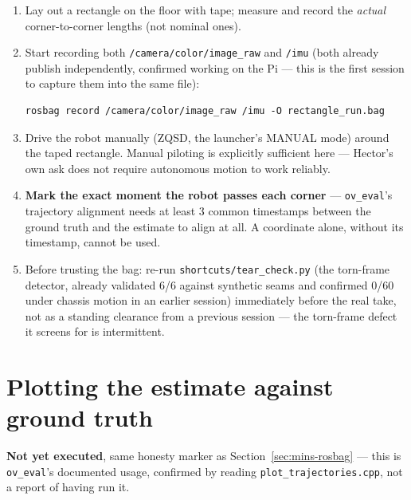 \documentclass[11pt]{report}
\newenvironment{warningbox}%
  {\begin{lrbox}{\warnbox}\begin{minipage}{0.90\textwidth}}%
  {\end{minipage}\end{lrbox}%
   \begin{center}\fcolorbox{black}{codebg}{\usebox{\warnbox}}\end{center}}
\begin{document}
\begin{enumerate}
  \item Lay out a rectangle on the floor with tape; measure and record the
  \emph{actual} corner-to-corner lengths (not nominal ones).
  \item Start recording both \texttt{/camera/color/image\_raw} and
  \texttt{/imu} (both already publish independently, confirmed working on
  the Pi --- this is the first session to capture them into the same file):
\begin{lstlisting}[style=shell]
rosbag record /camera/color/image_raw /imu -O rectangle_run.bag
\end{lstlisting}
  \item Drive the robot manually (ZQSD, the launcher's MANUAL mode) around
  the taped rectangle. Manual piloting is explicitly sufficient here ---
  Hector's own ask does not require autonomous motion to work reliably.
  \item \textbf{Mark the exact moment the robot passes each corner} ---
  \texttt{ov\_eval}'s trajectory alignment needs at least 3 common
  timestamps between the ground truth and the estimate to align at all.
  A coordinate alone, without its timestamp, cannot be used.
  \item Before trusting the bag: re-run \texttt{shortcuts/tear\_check.py}
  (the torn-frame detector, already validated 6/6 against synthetic seams
  and confirmed 0/60 under chassis motion in an earlier session) immediately
  before the real take, not as a standing clearance from a previous session
  --- the torn-frame defect it screens for is intermittent.
\end{enumerate}

\section{Plotting the estimate against ground truth}

\begin{warningbox}
\textbf{Not yet executed}, same honesty marker as
Section~\ref{sec:mins-rosbag} --- this is \texttt{ov\_eval}'s documented
usage, confirmed by reading \texttt{plot\_trajectories.cpp}, not a report of
having run it.
\end{warningbox}
\end{document}
